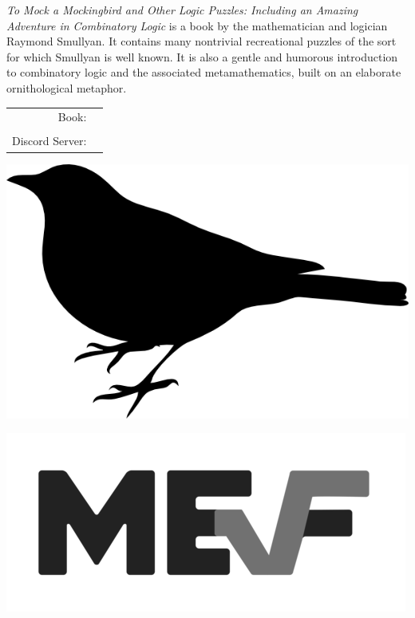 \documentclass[letterpaper]{article}
\begin{document}


\emph{To Mock a Mockingbird and Other Logic Puzzles: Including an Amazing Adventure in Combinatory Logic} is a book by the mathematician and logician Raymond Smullyan. It contains many nontrivial recreational puzzles of the sort for which Smullyan is well known. It is also a gentle and humorous introduction to combinatory logic and the associated metamathematics, built on an elaborate ornithological metaphor. 

\vspace{0.75in}
\begin{tabular}{rl}
    \csctimefont Book: & \\
    & \\
    \csctimefont Discord Server: & 
\end{tabular}

\vspace{0.5in}
\begin{center}
\includegraphics[scale = 0.75]{mockingbird_logo.png}
\end{center}

\vspace{-15pt}
\vspace{-15pt}
\centering {}

\raggedleft
\includegraphics[scale = 0.5]{mef_logo.png}
\end{document}
